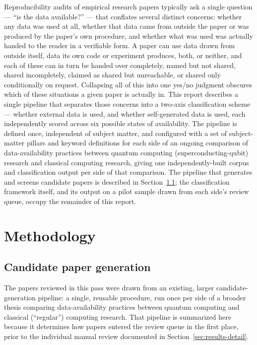 \documentclass[11pt]{article}
\begin{document}
Reproducibility audits of empirical research papers typically ask a single question ---
``is the data available?'' --- that conflates several distinct concerns: whether any
data was used at all, whether that data came from outside the paper or was produced by
the paper's own procedure, and whether what was used was actually handed to the reader
in a verifiable form. A paper can use data drawn from outside itself, data its own code
or experiment produces, both, or neither, and each of these can in turn be handed over
completely, named but not shared, shared incompletely, claimed as shared but
unreachable, or shared only conditionally on request. Collapsing all of this into one
yes/no judgment obscures which of these situations a given paper is actually in. This
report describes a single pipeline that separates those concerns into a two-axis
classification scheme --- whether external data is used, and whether self-generated
data is used, each independently scored across six possible states of availability.
The pipeline is defined once, independent of subject matter, and configured with a set
of subject-matter pillars and keyword definitions for each side of an ongoing
comparison of data-availability practices between quantum computing
(superconducting-qubit) research and classical computing research, giving one
independently-built corpus and classification output per side of that comparison. The
pipeline that generates and screens candidate papers is described in
Section~\ref{sec:candidate-generation}; the classification framework itself, and its
output on a pilot sample drawn from each side's review queue, occupy the remainder of
this report.

\section{Methodology}

\subsection{Candidate paper generation}
\label{sec:candidate-generation}

The papers reviewed in this pass were drawn from an existing, larger
candidate-generation pipeline: a single, reusable procedure, run once per side of a
broader thesis comparing data-availability practices between quantum computing and
classical (``regular'') computing research. That pipeline is summarized here because
it determines how papers entered the review queue in the first place, prior to the
individual manual review documented in Section~\ref{sec:results-detail}.
\end{document}
